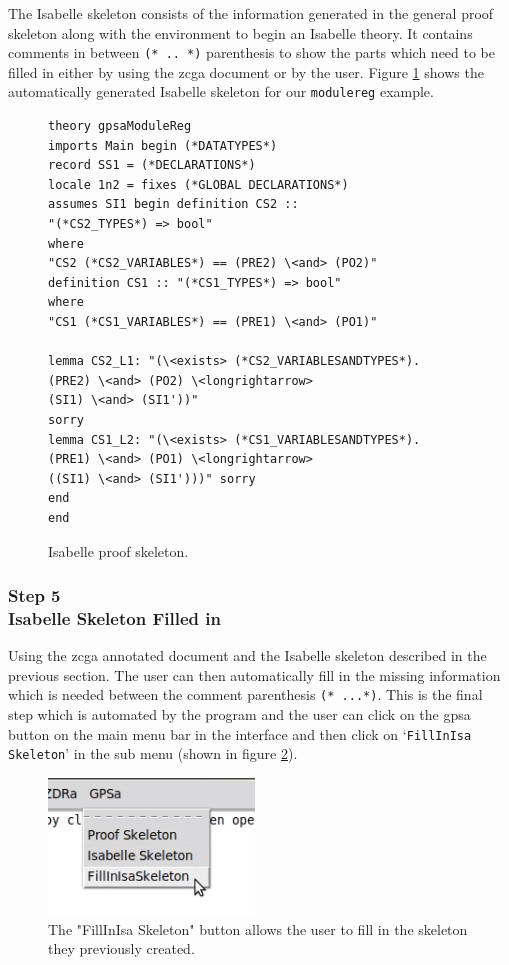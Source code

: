  The Isabelle skeleton consists of the information generated in the general
 proof skeleton along with the environment to begin an Isabelle theory. It
 contains comments in between \verb|(* .. *)| parenthesis to show the parts which
 need to be filled in either by using the \gls{zcga} document or by the user.
 Figure \ref{fig:isaFullexample} shows the automatically generated Isabelle
 skeleton for our \texttt{modulereg} example.

\begin{figure}[H]
\centering
\begin{scriptsize}
\begin{BVerbatim}
theory gpsaModuleReg
imports Main begin (*DATATYPES*)
record SS1 = (*DECLARATIONS*)
locale 1n2 = fixes (*GLOBAL DECLARATIONS*)
assumes SI1 begin definition CS2 ::
"(*CS2_TYPES*) => bool"
where
"CS2 (*CS2_VARIABLES*) == (PRE2) \<and> (PO2)"
definition CS1 :: "(*CS1_TYPES*) => bool"
where
"CS1 (*CS1_VARIABLES*) == (PRE1) \<and> (PO1)"

lemma CS2_L1: "(\<exists> (*CS2_VARIABLESANDTYPES*).
(PRE2) \<and> (PO2) \<longrightarrow> 
(SI1) \<and> (SI1'))" 
sorry 
lemma CS1_L2: "(\<exists> (*CS1_VARIABLESANDTYPES*).
(PRE1) \<and> (PO1) \<longrightarrow> 
((SI1) \<and> (SI1')))" sorry 
end
end
\end{BVerbatim}
\end{scriptsize}
\caption{Isabelle proof skeleton. \label{fig:isaFullexample}}
\end{figure}

\subsubsection{Step 5\\Isabelle Skeleton Filled in}

Using the \gls{zcga} annotated document and the Isabelle skeleton described in
the previous section. The user can then automatically fill in the missing
information which is needed between the comment parenthesis \verb|(* ...*)|.
This is the final step which is automated by the program and the user can click
on the \gls{gpsa} button on the main menu bar in the interface and then click on
`\texttt{FillInIsa Skeleton}' in the sub menu (shown in figure
\ref{fig:fillinisa}).

\begin{figure}[H]
\centering
\includegraphics[scale=1]{Figures/fullexample/fillinisabutton.png}
\caption{The "FillInIsa Skeleton" button allows the user to fill in the skeleton they previously created. \label{fig:fillinisa}}
\end{figure}

